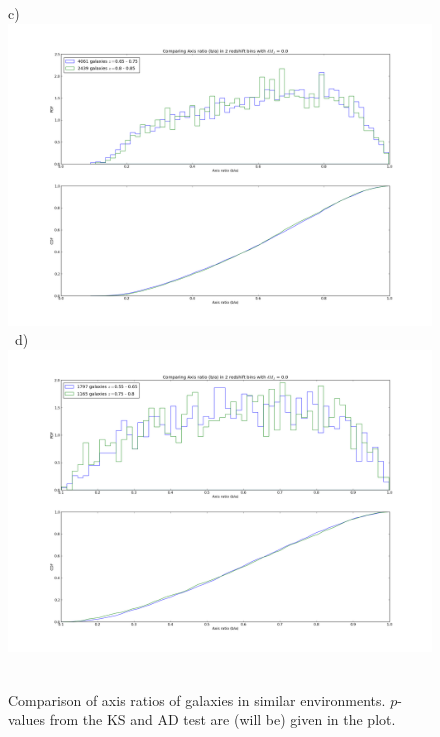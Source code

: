 \documentclass[twocolumn,useAMS,usenatbib]{mn2e}
\begin{document}
\begin{figure}
 c) \includegraphics[width=0.9\columnwidth]{axisratio(0)_0dot65-0dot75_0dot8-0dot85.png} \
 d) \includegraphics[width=0.9\columnwidth]{axisratio(0)_0dot55-0dot65_0dot75-0dot8.png} \
 \caption{Comparison of axis ratios of galaxies in similar environments. $p$-values from the KS and AD test are (will be) given in the plot.}
 \label{fig:axisratio_similar}
\end{figure}
\end{document}

